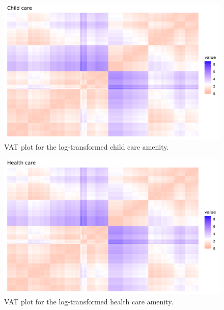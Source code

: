 \documentclass[11pt, a4paper]{article}
\begin{document}
{\begin{figure}[H]
\centering
\includegraphics[width=\textwidth]{./vat/childcare_vat_log.png}
\caption[Child care VAT plot]{VAT plot for the log-transformed child care amenity.}\label{childcarevat}
\end{figure}








\begin{figure}[H]
\centering
\includegraphics[width=\textwidth]{./vat/healthcare_vat_log.png}
\caption[Health care VAT plot]{VAT plot for the log-transformed health care amenity.}\label{healthcarevat}
\end{figure}







}
\end{document}
